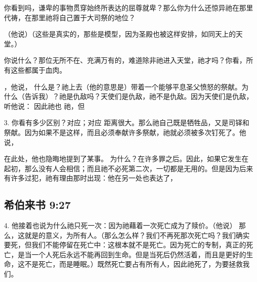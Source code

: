 你看到吗，谦卑的事物贯穿始终所表达的屈尊就卑？那么你为什么还惊异祂在那里代祷，在那里祂将自己置于大司祭的地位？\par

（他说）（这些是真实的，那些是模型，因为圣殿也被这样安排，如同天上的天堂。）\par

你说什么？那位无所不在、充满万有的，难道除非祂进入天堂，祂才吗？你看，所有这些都属于血肉。\par

，他说， 什么是？祂上去（他的意思是）带着一个能够平息圣父愤怒的祭献。为什么（告诉我）？祂是仇敌吗？天使们是仇敌，祂不是仇敌。因为天使们是仇敌，听他说：  因此祂也 祂，但\par

3.  你看有多少区别？对应；对应 距离很大。那么祂自己既是牺牲品，又是司铎和祭献。因为如果不是这样，而且必须奉献许多祭献，祂就必须被多次钉死了。他说，\par

在此处，他也隐晦地提到了某事。 为什么？在许多罪之后。因此，如果它发生在起初，那么没有人会相信；而且祂不必死第二次，一切都是无用的。但是因为后来有许多过犯，祂有理由那时出现：他在另一处也表达了， \par


\subsection{希伯来书 9:27}

4.   他接着也说为什么祂只死一次：因为祂藉着一次死亡成为了赎价。（他说） 那么，这就是的意义，为所有人。（那么怎么样？我们不再死那次死亡吗？我们确实要死，但我们不能停留在死亡中：这根本就不是死亡。因为死亡的专制，真正的死亡，是当一个人死后永远不能再回到生命。但是当死后仍然活着，而且是更好的生命，这不是死亡，而是睡眠。）既然死亡要占有所有人，因此祂死了，为要拯救我们。\par

